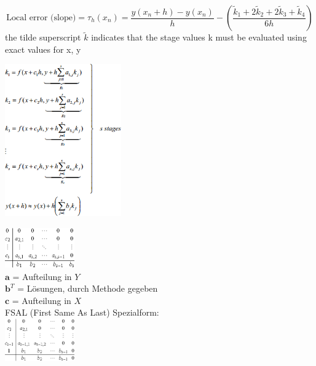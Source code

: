       $$
   \text{Local error (slope)} = \tau_h(x_n) = \frac{y(x_n +h)- y(x_n)}{h} - \left( \frac{\tilde k_1 + 2\tilde k_2 +2 \tilde k_3 + \tilde k_4}{6h} \right)
      $$
      the tilde superscript $\tilde k$ indicates that the stage values k must be evaluated using exact values for x, y

      \begin{minipage}{6cm}
        \includegraphics[width=5cm]{./bilder/ode_rungekutta_framework1.png}
      \end{minipage}
      \begin{minipage}{4.5cm}
        \includegraphics[width=3cm]{./bilder/ode_rungekutta_butcher.png}\\
        $\bm a$ = Aufteilung in $Y$\\
        $\bm b^T$ = Lösungen, durch Methode gegeben\\
        $\bm c$ = Aufteilung in $X$\\

        FSAL (First Same As Last) Spezialform:\\
        \includegraphics[width=3cm]{./bilder/butcher_fsal.png}
      \end{minipage}
      \hspace{0.5cm}

